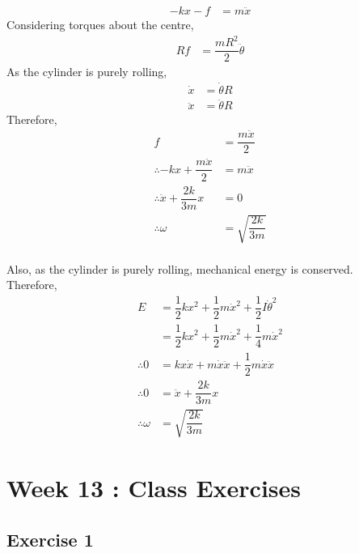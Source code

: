 \documentclass[fleqn, a4paper, 12pt]{article}
\theoremstyle{definition}
\theoremstyle{theorem}
\begin{document}
\begin{align*}
	-kx - f &= m \ddot{x}
\end{align*}
Considering torques about the centre,
\begin{align*}
	R f &= \dfrac{m R^2}{2} \ddot{\theta}
\end{align*}
As the cylinder is purely rolling,
\begin{align*}
	\dot{x} &= \dot{\theta} R\\
	\ddot{x} &= \ddot{\theta} R
\end{align*}
Therefore,
\begin{align*}
	f &= \dfrac{m \ddot{x}}{2}\\
	\therefore -kx + \dfrac{m \ddot{x}}{2} &= m \ddot{x}\\
	\therefore \ddot{x} + \dfrac{2k}{3m} x &= 0\\
	\therefore \omega &= \sqrt{\dfrac{2k}{3m}}
\end{align*}
~\\
Also, as the cylinder is purely rolling, mechanical energy is conserved.\\
Therefore,
\begin{align*}
	E &= \dfrac{1}{2} k x^2 + \dfrac{1}{2} m \dot{x}^2 + \dfrac{1}{2} I {\dot{\theta}}^2\\
	&= \dfrac{1}{2} k x^2 + \dfrac{1}{2} m \dot{x}^2 + \dfrac{1}{4} m \dot{x}^2\\
	\therefore 0 &= k x \dot{x} + m \dot{x} \ddot{x} + \dfrac{1}{2} m \dot{x} \ddot{x}\\
	\therefore 0 &= \ddot{x} + \dfrac{2k}{3m} x\\
	\therefore \omega &= \sqrt{\dfrac{2k}{3m}}
\end{align*}

\section*{Week 13 : Class Exercises}

\subsection*{Exercise 1}
\end{document}
